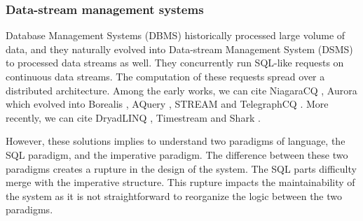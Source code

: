 \subsubsection{Data-stream management systems}


Database Management Systems (DBMS) historically processed large volume of data, and they naturally evolved into Data-stream Management System (DSMS) to processed data streams as well.
They concurrently run SQL-like requests on continuous data streams.
The computation of these requests spread over a distributed architecture.
Among the early works, we can cite NiagaraCQ \cite{Chen2000,Naughton2001}, Aurora \cite{Abadi2003,Abadi2003a,Balakrishnan2004} which evolved into Borealis \cite{Abadi2005}, AQuery \cite{Lerner2003}, STREAM \cite{Arasu2003,Arasu2005} and TelegraphCQ \cite{Krishnamurthy2003,Chandrasekaran2003}.
More recently, we can cite DryadLINQ \cite{Isard2007,Yu2009}, Timestream \cite{Qian2013} and Shark \cite{Xin2013}.

However, these solutions implies to understand two paradigms of language, the SQL paradigm, and the imperative paradigm.
The difference between these two paradigms creates a rupture in the design of the system.
The SQL parts difficulty merge with the imperative structure.
This rupture impacts the maintainability of the system as it is not straightforward to reorganize the logic between the two paradigms.





